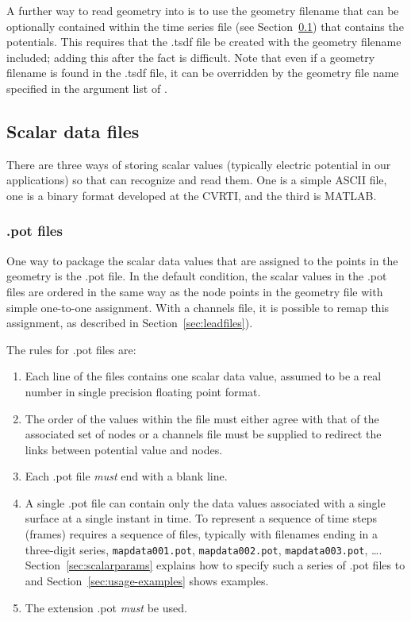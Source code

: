 A further way to read geometry into \map{} is to use the geometry filename
that can be optionally contained within the time series file (see
Section~\ref{sec:datafiles}) that contains the potentials.  This requires
that the .tsdf file be created with the geometry filename
included; adding this after the fact is difficult.  Note that even if a
geometry filename is found in the .tsdf file, it can be overridden
by the geometry file name specified in the argument list of \map{}.


\subsection{Scalar data files}
\label{sec:datafiles} 

There are three ways of storing scalar values (typically electric potential
in our applications) so that \map{} can recognize and read them.  One is a
simple ASCII file, one is a binary format developed at the
CVRTI\@, and the third is MATLAB. 

\subsubsection{.pot files}
\label{sec:potfiles} 

One way to package the scalar data values that are assigned to the points
in the geometry is the .pot file.  In the default condition,
the scalar values in the .pot files are ordered in the same way as
the node points in the geometry file with simple one-to-one assignment.
With a channels file, it is possible to remap this assignment, as described
in Section~\ref{sec:leadfiles}).

\noindent
The rules for .pot files are:
%
\begin{enumerate}
  \item Each line of the files contains one scalar data value, assumed to
        be a real number in single precision floating point format. 
  \item The order of the values within the file must either agree with that
        of the associated set of nodes or a channels file must be supplied
        to redirect the links between potential value and nodes.
  \item Each .pot file {\em must\/} end with a blank line.
  \item A single .pot file can contain only the data values
        associated with a single surface at a single instant in time.  To
        represent a sequence of time steps (frames) requires a sequence of
        files, typically with filenames ending in a three-digit series,
        \eg{} \texttt{mapdata001.pot}, \texttt{mapdata002.pot},
        \texttt{mapdata003.pot}, \ldots{}.  Section~\ref{sec:scalarparams}
        explains how to specify such a series of .pot files to \map{} and
        Section~\ref{sec:usage-examples} shows examples.
  \item The extension .pot {\em must\/} be used.
\end{enumerate}


